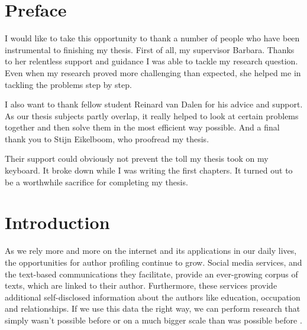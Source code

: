 \documentclass[
10pt, %
a4paper, %
oneside, %
headinclude,footinclude, %
] {book}%
\begin{document}





\chapter*{Preface}

I would like to take this opportunity to thank a number of people who have been instrumental to finishing my thesis. 
First of all, my supervisor Barbara. Thanks to her relentless support and guidance I was able to tackle my research question. Even when my research proved more challenging than expected, she helped me in tackling the problems step by step. 

I also want to thank fellow student Reinard van Dalen for his advice and support. As our thesis subjects partly overlap, it really helped to look at certain problems together and then solve them in the most efficient way possible. And a final thank you to Stijn Eikelboom, who proofread my thesis.


Their support could obviously not prevent the toll my thesis took on my keyboard. It broke down while I was writing the first chapters. It turned out to be a worthwhile sacrifice for completing my thesis. 





\chapter{Introduction}
As we rely more and more on the internet and its applications in our daily lives, the opportunities for author profiling continue to grow. Social media services, and the text-based communications they facilitate, provide an ever-growing corpus of texts, which are linked to their author. Furthermore, these services provide additional self-disclosed information about the authors like education, occupation and relationships. If we use this data the right way, we can perform research that simply wasn't possible before or on a much bigger scale than was possible before \citep{sloan}.
\end{document}
